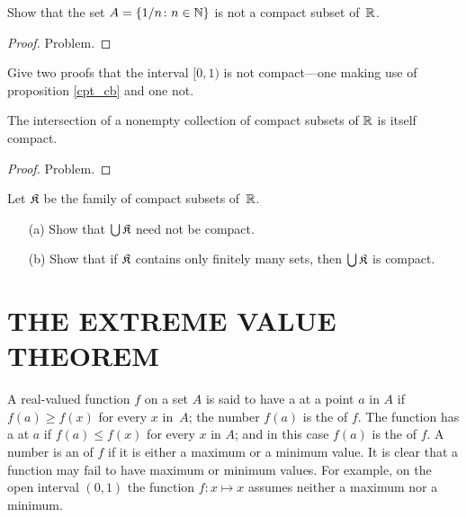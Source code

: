 \begin{exam} Show that the set $A = \{1/n \colon n \in \mathbb{N}\}$ is not a compact subset of~$\mathbb{R}$.
\end{exam}

\begin{proof} Problem.  \ns \end{proof}

\begin{prob}  Give two proofs that the interval $[0,1)$ is not compact---one making use of
proposition \ref{cpt_cb} and one not.
\end{prob}

\begin{prop}\label{cpt_cnd2} The intersection of a nonempty collection of compact subsets
of $\mathbb{R}$ is itself compact.
\end{prop}

\begin{proof} Problem.  \ns \end{proof}

\begin{prob}\label{cpt_cnd3} Let $\mathfrak{K}$ be the family of compact subsets of~$\mathbb{R}$.
 \begin{enumerate}
  \item[(a)] Show that $\bigcup\mathfrak{K}$ need not be compact.
  \item[(b)] Show that if $\mathfrak{K}$ contains only finitely many sets, then
$\bigcup\mathfrak{K}$ is compact.
 \end{enumerate}
\end{prob}







\section{THE EXTREME VALUE THEOREM}
\begin{defn} A real-valued function $f$ on a set $A$ is said to have a
 at a point $a$ in $A$ if $f(a) \ge f(x)$ for every $x$ in~$A$; the number $f(a)$
is the
 of $f$. The function has a
 at $a$ if $f(a) \le f(x)$ for every $x$ in $A$; and in this case $f(a)$ is the
 of $f$. A number is an
 of $f$ if it is either a maximum or a minimum value. It is clear that a
function may fail to have maximum or minimum values.  For example, on the open interval
$(0,1)$ the function $f:x\mapsto x$ assumes neither a maximum nor a minimum.
\end{defn}

